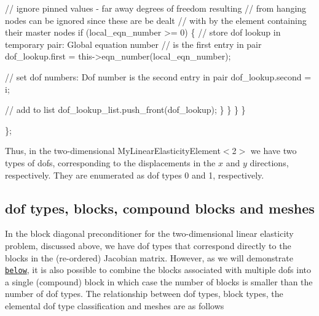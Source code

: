 \begin{DoxyCodeInclude}
       \textcolor{comment}{// ignore pinned values - far away degrees of freedom resulting }
       \textcolor{comment}{// from hanging nodes can be ignored since these are be dealt}
       \textcolor{comment}{// with by the element containing their master nodes}
       \textcolor{keywordflow}{if} (local\_eqn\_number >= 0)
        \{
         \textcolor{comment}{// store dof lookup in temporary pair: Global equation number}
         \textcolor{comment}{// is the first entry in pair}
         dof\_lookup.first = this->eqn\_number(local\_eqn\_number);
         
         \textcolor{comment}{// set dof numbers: Dof number is the second entry in pair}
         dof\_lookup.second = i;
         
         \textcolor{comment}{// add to list}
         dof\_lookup\_list.push\_front(dof\_lookup);
        \}
      \}
    \}
  \}

\};

\end{DoxyCodeInclude}


Thus, in the two-\/dimensional {\ttfamily My\+Linear\+Elasticity\+Element$<$2$>$} we have two types of dofs, corresponding to the displacements in the $x$ and $ y $ directions, respectively. They are enumerated as dof types 0 and 1, respectively.\hypertarget{index_dof_types_and_block_types}{}\subsection{dof types, blocks, compound blocks and meshes}\label{index_dof_types_and_block_types}
In the block diagonal preconditioner for the two-\/dimensional linear elasticity problem, discussed above, we have dof types that correspond directly to the blocks in the (re-\/ordered) Jacobian matrix. However, as we will demonstrate \href{#compound}{\tt below}, it is also possible to combine the blocks associated with multiple dofs into a single (compound) block in which case the number of blocks is smaller than the number of dof types. The relationship between dof types, block types, the elemental dof type classification and meshes are as follows


